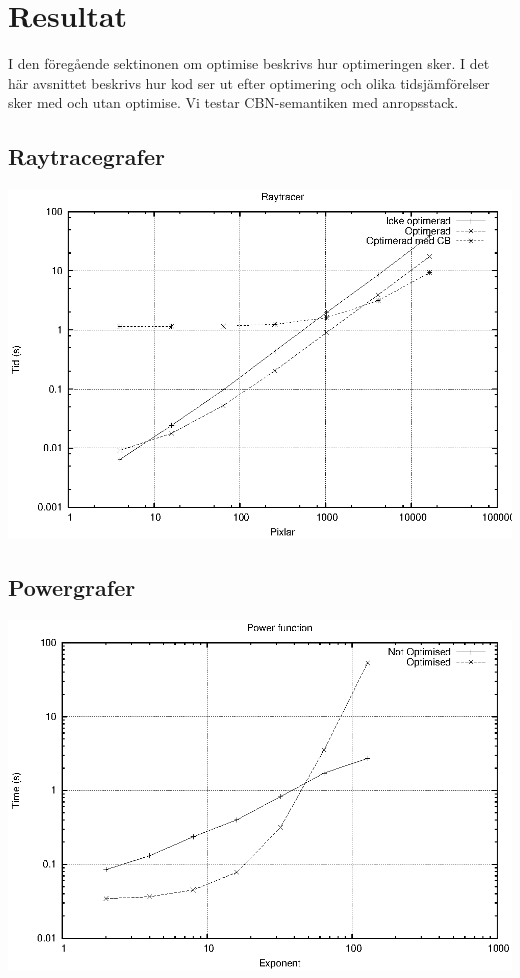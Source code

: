 \documentclass[Rapport]{subfiles}
\begin{document}
\section{Resultat}
\label{sec:Resultat}


I den föregående sektinonen om optimise beskrivs hur optimeringen sker.
I det här avsnittet beskrivs hur kod ser ut efter optimering och 
olika tidsjämförelser sker med och utan optimise. 
Vi testar CBN-semantiken med anropsstack.

\subsection{Raytracegrafer}

\includegraphics{shapes.eps}



\subsection{Powergrafer}

\includegraphics{power.eps}
\end{document}
